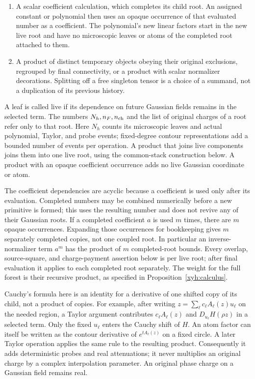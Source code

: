 \begin{definition}
\begin{enumerate}[label=\textup{(\roman*)}]
expanded using Lemma~\ref{xyh:fourier}; its atom value is kept as a
separate factor and its normalized child direction is fixed before
Cauchy differentiation.
\item A scalar coefficient calculation, which completes its child root.
An assigned constant or polynomial then uses an opaque occurrence of
that evaluated number as a coefficient. The polynomial's new linear
factors start in the new live root and have no microscopic leaves or
atoms of the completed root attached to them.
\item A product of distinct temporary objects obeying their original
exclusions, regrouped by final connectivity, or a product with scalar
normalizer decorations. Splitting off a free singleton tensor is a
choice of a summand, not a duplication of its previous history.
\end{enumerate}
A leaf is called live if its dependence on future Gaussian fields remains
in the selected term. The numbers $N_h,n_F,n_{\rm ch}$ and the list of
original charges of a root refer only to that root. Here $N_h$ counts its
microscopic leaves and actual polynomial, Taylor, and probe events;
fixed-degree contour representations add a bounded number of events per
operation. A product that joins live components joins them into one live
root, using the common-stack construction below. A product with an opaque
coefficient occurrence adds no live Gaussian coordinate or atom.

The coefficient dependencies are acyclic because a coefficient is used
only after its evaluation. Completed numbers may be combined numerically
before a new primitive is formed; this uses the resulting number and does
not revive any of their Gaussian roots. If a completed coefficient $a$ is
used $m$ times, there are $m$ opaque occurrences. Expanding those occurrences for
bookkeeping gives $m$ separately completed copies, not one coupled root.
In particular an inverse-normalizer term $a^m$ has the product of $m$
completed-root bounds. Every overlap, source-square, and charge-payment
assertion below is per live root; after final evaluation it applies to
each completed root separately. The weight for the full forest is their
recursive product, as specified in Proposition~\ref{xyh:calculus}.
\end{definition}

Cauchy's formula here is an identity for a derivative of one shifted copy
of its child, not a product of copies. For example, after writing
$z=\sum_\ell c_\ell A_\ell(z)u_\ell$ on the needed region,
a Taylor argument contributes $c_\ell A_\ell(z)$ and
$D_{u_\ell}H(\rho z)$ in a selected term. Only the fixed $u_\ell$ enters
the Cauchy shift of $H$. An atom factor can itself be written as the
contour derivative of $e^{tA_\ell(z)}$ on a fixed circle. A later
Taylor operation applies the same rule to the resulting product.
Consequently it adds deterministic probes and real attenuations;
it never multiplies an original charge by a complex interpolation
parameter. An original phase charge on a Gaussian field remains real.

